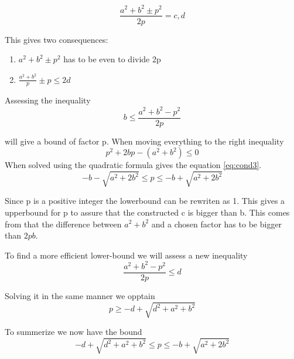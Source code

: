 \documentclass{article}
\begin{document}
$$
  	\frac{a^2+b^2\pm p^2}{2p} = c,d
$$	

This gives two consequences:
\begin{enumerate}
	\item $a^2+b^2 \pm p^2$ has to be even to divide 2p
	\item $\frac{a^2+b^2}{p} \pm p \le 2d$
\end{enumerate}

Assessing the inequality 
$$
b \le \frac{a^2+b^2-p^2}{2p}
$$

will give a bound of factor p. When moving everything to the right inequality 
$$
p^2 + 2bp - (a^2+b^2) \le 0
$$
When solved using the quadratic formula gives the equation \ref{eq:cond3}.
\begin{equation}\label{eq:cond3}
	-b - \sqrt{a^2 + 2b^2} \le p \le -b + \sqrt{a^2 + 2b^2}
\end{equation}

Since p is a positive integer the lowerbound can be rewriten as 1. This gives a upperbound for p to assure that the constructed c is bigger than b. This comes from that the difference between $a^2+b^2$ and a chosen factor has to be bigger than $2pb$.

To find a more efficient lower-bound we will assess a new inequality
$$
\frac{a^2+b^2-p^2}{2p} \le d
$$

Solving it in the same manner we opptain
$$
p \geq -d+\sqrt{d^2+a^2+b^2}
$$

To summerize we now have the bound
\begin{equation}
	-d+\sqrt{d^2+a^2+b^2} \le p \le -b + \sqrt{a^2 + 2b^2}
\end{equation}
\end{document}
